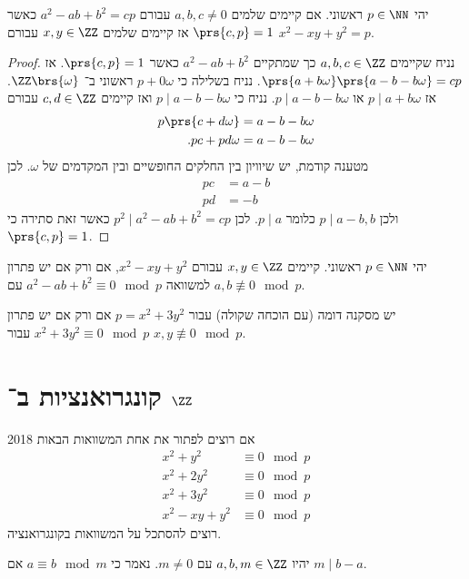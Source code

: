 \documentclass[a4paper,10pt,twoside,openany]{book}
\begin{document}
\begin{theorem}
יהי
$p \in \NN$
ראשוני. אם קיימים שלמים
$a,b,c \neq 0$
עבורם
$a^2 - ab + b^2 = cp$
כאשר
$\prs{c,p} = 1$
אז קיימים שלמים
$x,y\in \ZZ$
עבורם
$x^2 - xy + y^2 = p$.
\end{theorem}
\begin{proof}
נניח שקיימים
$a,b,c \in \ZZ$
כך שמתקיים
$a^2 - ab + b^2$
כאשר
$\prs{c,p} = 1$.
אז
$\prs{a+b\omega}\prs{a-b-b\omega} = cp$.
נניח בשלילה כי
$p + 0\omega$
ראשוני ב־%
$\ZZ\brs{\omega}$.
אז
$p \mid a+b\omega$
או
$p \mid a-b-b\omega$.
נניח כי
$p \mid a-b-b\omega$
ואז קיימים
$c,d\in\ZZ$
עבורם
\begin{align*}
p\prs{c+d\omega} &= a-b-b\omega \\
\text{.} pc + pd\omega &= a-b-b\omega
\end{align*}
מטענה קודמת, יש שיוויון בין החלקים החופשיים ובין המקדמים של
$\omega$.
לכן
\begin{align*}
pc &= a-b \\
pd &= -b
\end{align*}
ולכן
$p\mid a-b, b$
כלומר
$p \mid a$.
לכן
$p^2 \mid a^2 - ab + b^2 = cp$
כאשר זאת סתירה כי
$\prs{c,p} = 1$.
\end{proof}

\begin{corollary}
יהי
$p \in \NN$
ראשוני. קיימים
$x,y\in \ZZ$
עבורם
$x^2 - xy + y^2$,
אם ורק אם יש פתרון למשוואה
$a^2 - ab + b^2 \equiv 0 \mod{p}$
עם
$a,b \not\equiv 0 \mod{p}$.
\end{corollary}
\begin{remark}
יש מסקנה דומה (עם הוכחה שקולה) עבור
$p = x^2 + 3y^2$
אם ורק אם יש פתרון
$x^2 + 3y^2 \equiv 0 \mod{p}$
עבור
$x,y \not\equiv 0 \mod{p}$.
\end{remark}
\section{קונגרואנציות ב־%
$\ZZ$}
אם רוצים לפתור את אחת המשוואות הבאות%
%
{2018}
\begin{align*}
x^2 + y^2 &\equiv 0 \mod{p} \\
x^2 + 2y^2 &\equiv 0 \mod{p} \\
x^2 + 3y^2 &\equiv 0 \mod{p} \\
x^2 -xy + y^2 &\equiv 0 \mod{p}
\end{align*}
רוצים להסתכל על המשוואות בקונגרואנציה.

\begin{definition}
יהיו
$a,b,m\in \ZZ$
עם
$m \neq 0$.
נאמר כי
$a \equiv b \mod{m}$
אם
$m \mid b-a$.

\end{definition}
\end{document}
